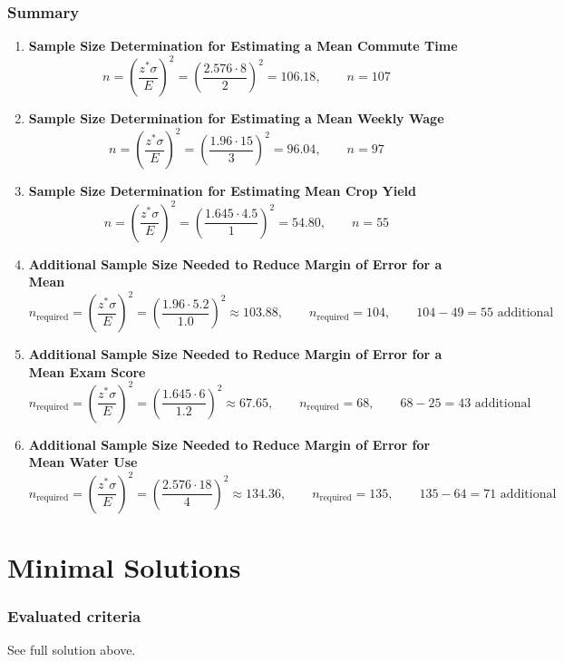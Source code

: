 	\section*{Summary}
	\begin{enumerate}
		\item \textbf{Sample Size Determination for Estimating a Mean Commute Time}
		\[
		n = \left(\frac{z^*\sigma}{E}\right)^2
		= \left(\frac{2.576\cdot 8}{2}\right)^2
		= 106.18,
		\qquad \boxed{n=107}
		\]

		\item \textbf{Sample Size Determination for Estimating a Mean Weekly Wage}
		\[
		n = \left(\frac{z^*\sigma}{E}\right)^2
		= \left(\frac{1.96\cdot 15}{3}\right)^2
		= 96.04,
		\qquad \boxed{n=97}
		\]

		\item \textbf{Sample Size Determination for Estimating Mean Crop Yield}
		\[
		n = \left(\frac{z^*\sigma}{E}\right)^2
		= \left(\frac{1.645\cdot 4.5}{1}\right)^2
		= 54.80,
		\qquad \boxed{n=55}
		\]

		\item \textbf{Additional Sample Size Needed to Reduce Margin of Error for a Mean}
		\[
		n_{\text{required}} = \left(\frac{z^*\sigma}{E}\right)^2
		= \left(\frac{1.96\cdot 5.2}{1.0}\right)^2
		\approx 103.88,
		\qquad \boxed{n_{\text{required}}=104},
		\qquad \boxed{104-49=55\text{ additional}}
		\]

		\item \textbf{Additional Sample Size Needed to Reduce Margin of Error for a Mean Exam Score}
		\[
		n_{\text{required}} = \left(\frac{z^*\sigma}{E}\right)^2
		= \left(\frac{1.645\cdot 6}{1.2}\right)^2
		\approx 67.65,
		\qquad \boxed{n_{\text{required}}=68},
		\qquad \boxed{68-25=43\text{ additional}}
		\]

		\item \textbf{Additional Sample Size Needed to Reduce Margin of Error for Mean Water Use}
		\[
		n_{\text{required}} = \left(\frac{z^*\sigma}{E}\right)^2
		= \left(\frac{2.576\cdot 18}{4}\right)^2
		\approx 134.36,
		\qquad \boxed{n_{\text{required}}=135},
		\qquad \boxed{135-64=71\text{ additional}}
		\]
	\end{enumerate}


\part{Minimal Solutions}

\section*{Evaluated criteria}
See full solution above.

